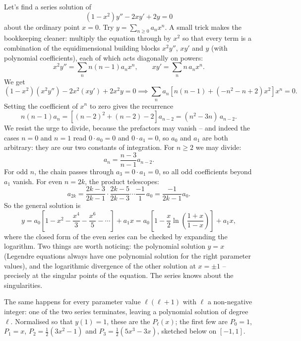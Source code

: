\documentclass[a4paper]{scrartcl}
\begin{document}
\begin{example}
	Let's find a series solution of
	$$
	(1 - x^2) y'' - 2xy' + 2y = 0
	$$
	about the ordinary point $x = 0$. Try $y = \sum_{n \geq 0} a_n x^n$. A small trick makes the bookkeeping cleaner: multiply the equation through by $x^2$ so that every term is a combination of the equidimensional building blocks $x^2 y''$, $x y'$ and $y$ (with polynomial coefficients), each of which acts diagonally on powers:
	$$
	x^2 y'' = \sum_n n(n-1) a_n x^n, \qquad xy' = \sum_n n \, a_n x^n.
	$$
	We get
	$$
	(1 - x^2)(x^2 y'') - 2x^2 (xy') + 2x^2 y = 0 \implies \sum_n a_n \left[n(n - 1) + (-n^2 - n + 2)x^2\right] x^n = 0.
	$$
	Setting the coefficient of $x^n$ to zero gives the recurrence
	$$
	n (n - 1) a_n = \left[(n-2)^2 + (n - 2) - 2\right] a_{n - 2} = (n^2 - 3n) \, a_{n - 2}.
	$$
	We resist the urge to divide, because the prefactors may vanish -- and indeed the cases $n = 0$ and $n = 1$ read $0 \cdot a_0 = 0$ and $0 \cdot a_1 = 0$, so $a_0$ and $a_1$ are both arbitrary: they are our two constants of integration. For $n \geq 2$ we may divide:
	$$
	a_n = \frac{n - 3}{n - 1} a_{n - 2}.
	$$
	For odd $n$, the chain passes through $a_3 = 0 \cdot a_1 = 0$, so all odd coefficients beyond $a_1$ vanish. For even $n = 2k$, the product telescopes:
	$$
	a_{2k} = \frac{2k - 3}{2k - 1} \cdot \frac{2k - 5}{2k - 3} \cdots \frac{-1}{1} \, a_0 = \frac{-1}{2k - 1} a_0.
	$$
	So the general solution is
	$$
	y = a_0 \left[1 - x^2 - \frac{x^4}{3} - \frac{x^6}{5} - \cdots \right] + a_1 x = a_0 \left[1 - \frac x2 \ln \left(\frac{1 + x}{1 - x}\right)\right] + a_1 x,
	$$
	where the closed form of the even series can be checked by expanding the logarithm. Two things are worth noticing: the polynomial solution $y = x$ (Legendre equations always have one polynomial solution for the right parameter values), and the logarithmic divergence of the other solution at $x = \pm 1$ -- precisely at the singular points of the equation. The series knows about the singularities.
\end{example}

The same happens for every parameter value $\ell(\ell + 1)$ with $\ell$ a non-negative integer: one of the two series terminates, leaving a polynomial solution of degree $\ell$. Normalised so that $y(1) = 1$, these are the  $P_\ell(x)$; the first few are $P_0 = 1$, $P_1 = x$, $P_2 = \frac12(3x^2 - 1)$ and $P_3 = \frac12 (5x^3 - 3x)$, sketched below on $[-1, 1]$.
\end{document}
